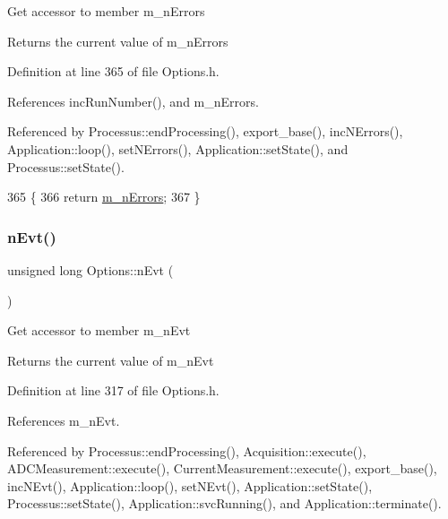 Get accessor to member m\+\_\+n\+Errors \begin{DoxyReturn}{Returns}
the current value of m\+\_\+n\+Errors 
\end{DoxyReturn}


Definition at line 365 of file Options.\+h.



References inc\+Run\+Number(), and m\+\_\+n\+Errors.



Referenced by Processus\+::end\+Processing(), export\+\_\+base(), inc\+N\+Errors(), Application\+::loop(), set\+N\+Errors(), Application\+::set\+State(), and Processus\+::set\+State().


\begin{DoxyCode}
365                                  \{
366                 \textcolor{keywordflow}{return} \hyperlink{classOptions_ae6460776ac3433103d88729a6811fc56}{m\_nErrors};
367         \}
\end{DoxyCode}
\mbox{\label{classOptions_ad769b256263a4ac24dd6f989ae724ab7}} 
\subsubsection{\texorpdfstring{n\+Evt()}{nEvt()}}
{\footnotesize\ttfamily unsigned long Options\+::n\+Evt (\begin{DoxyParamCaption}{ }\end{DoxyParamCaption})\hspace{0.3cm}{\ttfamily [inline]}}

Get accessor to member m\+\_\+n\+Evt \begin{DoxyReturn}{Returns}
the current value of m\+\_\+n\+Evt 
\end{DoxyReturn}


Definition at line 317 of file Options.\+h.



References m\+\_\+n\+Evt.



Referenced by Processus\+::end\+Processing(), Acquisition\+::execute(), A\+D\+C\+Measurement\+::execute(), Current\+Measurement\+::execute(), export\+\_\+base(), inc\+N\+Evt(), Application\+::loop(), set\+N\+Evt(), Application\+::set\+State(), Processus\+::set\+State(), Application\+::svc\+Running(), and Application\+::terminate().


